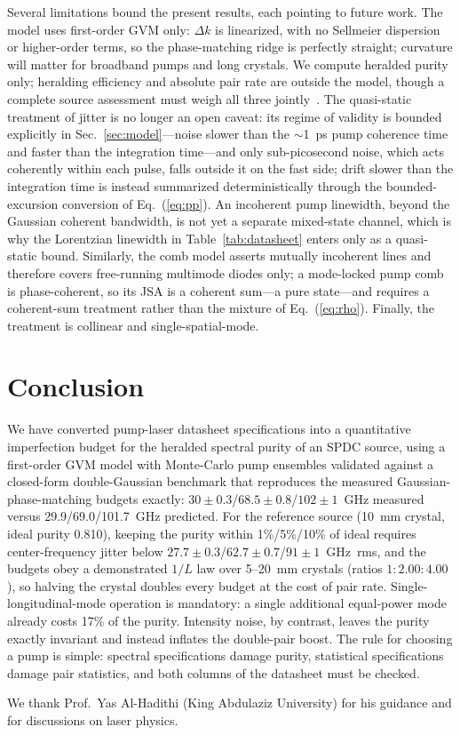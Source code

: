 Several limitations bound the present results, each pointing to future
work. The model uses first-order GVM only: $\Delta k$ is linearized,
with no Sellmeier dispersion or higher-order terms, so the
phase-matching ridge is perfectly straight; curvature will matter for
broadband pumps and long crystals. We compute heralded purity only;
heralding efficiency and absolute pair rate are outside the model,
though a complete source assessment must weigh all three
jointly~\cite{meyerscott2020}. The quasi-static treatment of jitter
is no longer an open caveat: its regime of validity is bounded
explicitly in Sec.~\ref{sec:model}---noise slower than the
$\sim$1~ps pump coherence time and faster than the integration
time---and only sub-picosecond noise, which acts coherently within
each pulse, falls outside it on the fast side; drift slower than the
integration time is instead summarized deterministically through the
bounded-excursion conversion of Eq.~(\ref{eq:pp}). An incoherent pump linewidth,
beyond the Gaussian coherent bandwidth, is not yet a separate
mixed-state channel, which is why the Lorentzian linewidth in
Table~\ref{tab:datasheet} enters only as a quasi-static bound.
Similarly, the comb model asserts mutually incoherent lines and
therefore covers free-running multimode diodes only; a mode-locked
pump comb is phase-coherent, so its JSA is a coherent sum---a pure
state---and requires a coherent-sum treatment rather than the mixture
of Eq.~(\ref{eq:rho}). Finally, the treatment is collinear and
single-spatial-mode.

\section{Conclusion}

We have converted pump-laser datasheet specifications into a
quantitative imperfection budget for the heralded spectral purity of
an SPDC source, using a first-order GVM model with Monte-Carlo pump
ensembles validated against a closed-form double-Gaussian benchmark
that reproduces the measured Gaussian-phase-matching budgets exactly:
$30 \pm 0.3$/$68.5 \pm 0.8$/$102 \pm 1$~GHz measured versus
29.9/69.0/101.7~GHz predicted. For the reference source (10~mm
crystal, ideal purity 0.810), keeping the purity within 1\%/5\%/10\%
of ideal requires center-frequency jitter below
$27.7 \pm 0.3$/$62.7 \pm 0.7$/$91 \pm 1$~GHz~rms, and the budgets
obey a demonstrated $1/L$ law over 5--20~mm crystals (ratios
$1:2.00:4.00$), so halving the crystal doubles every budget at the
cost of pair rate. Single-longitudinal-mode operation is mandatory: a
single additional equal-power mode already costs 17\% of the purity.
Intensity noise, by contrast, leaves the purity exactly invariant and
instead inflates the double-pair boost. The rule for choosing a pump
is simple: spectral specifications damage purity, statistical
specifications damage pair statistics, and both columns of the
datasheet must be checked.

\begin{acknowledgments}
We thank Prof.\ Yas Al-Hadithi (King Abdulaziz University) for his
guidance and for discussions on laser physics.
\end{acknowledgments}
